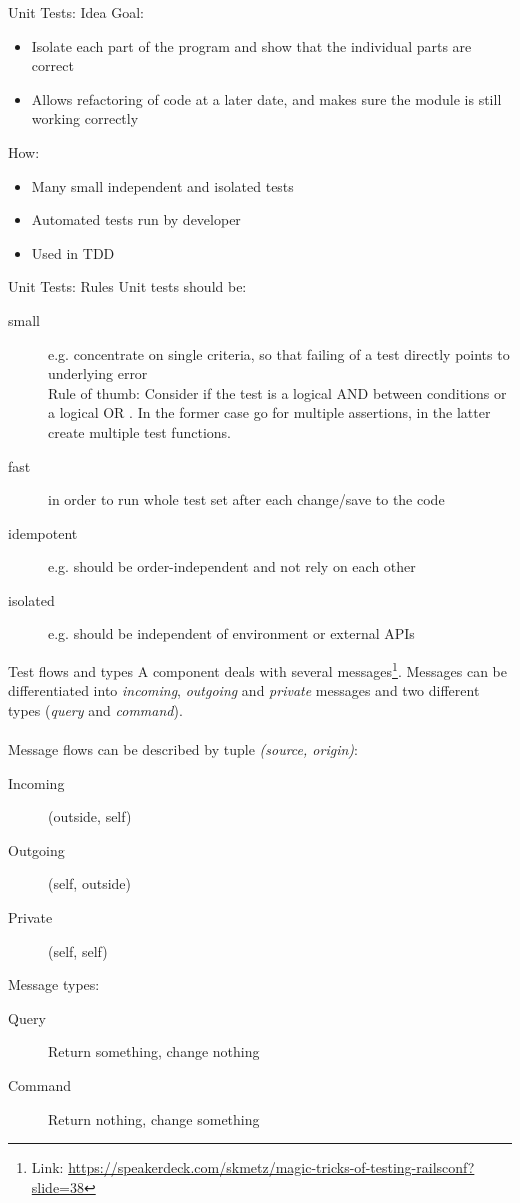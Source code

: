 \begin{frame}{Unit Tests: Idea}
Goal:
\begin{itemize}
\item Isolate each part of the program and show that the individual parts are correct
\item Allows refactoring of code at a later date, and makes sure the module is still working correctly
\end{itemize}
How:
\begin{itemize}
\item Many small independent and isolated tests
\item Automated tests run by developer
\item Used in TDD
\end{itemize}
\end{frame}

\begin{frame}{Unit Tests: Rules}
Unit tests should be:
\begin{description}
\item[small] e.g. concentrate on single criteria, so that failing of a test directly points to underlying error \\
Rule of thumb: Consider if the test is a logical AND between conditions or a logical OR . In the former case go for multiple assertions, in the latter create multiple test functions.
\item[fast] in order to run whole test set after each change/save to the code
\item[idempotent] e.g. should be order-independent and not rely on each other
\item[isolated] e.g. should be independent of environment or external APIs
\end{description}
\end{frame}

\begin{frame}{Test flows and types}
A component deals with several messages\footnote{Link: \url{https://speakerdeck.com/skmetz/magic-tricks-of-testing-railsconf?slide=38}}.
Messages can be differentiated into \textit{incoming}, \textit{outgoing} and \textit{private} messages and two different types (\textit{query} and \textit{command}).\\
\hfill\\
Message flows can be described by tuple \textit{(source, origin)}:
\begin{description}
\item[Incoming] (outside, self)
\item[Outgoing] (self, outside)
\item[Private] (self, self)
\end{description}
Message types:
\begin{description}
\item[Query] Return something, change nothing
\item[Command] Return nothing, change something
\end{description}
\end{frame}

